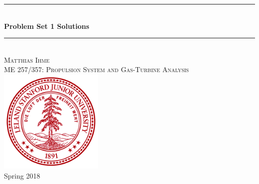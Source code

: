 \documentclass[12pt]{article}
\begin{document}

\begin{titlepage}

\newcommand{\ddz}[1]{\frac{\mathrm{d} #1}{\mathrm{d} z}}
\newcommand{\HRule}{\rule{\linewidth}{0.5mm}} %

\center %
 




\HRule \\[1 cm]
{ \huge \bfseries Problem Set 1 Solutions}\\[0.4cm] %
\HRule \\[2cm]
 

\Large  \textsc{Matthias Ihme}\\[2cm] %
\textsc{\large ME 257/357: Propulsion System and Gas-Turbine Analysis}\\[2cm] %

\includegraphics[width=50mm]{stanford_seal.png}\\[2cm] %
{\large Spring 2018}%

\vfill %

\end{titlepage}
\end{document}
